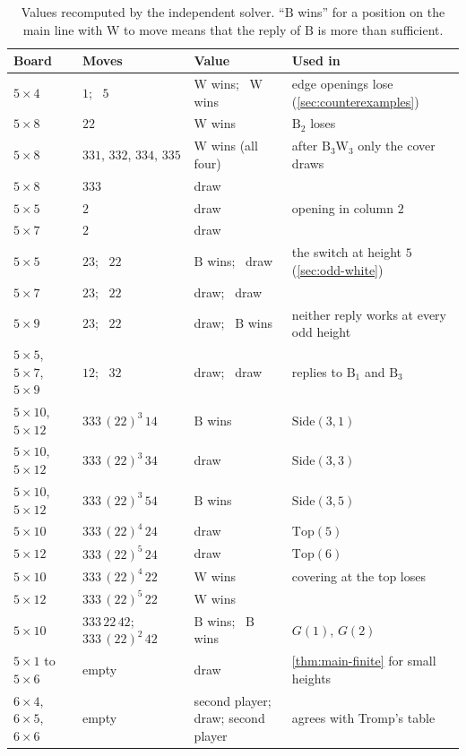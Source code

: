 \documentclass[11pt,a4paper]{article}
\theoremstyle{plain}
\theoremstyle{definition}
\newcommand{\B}{\mathrm{B}}
\newcommand{\W}{\mathrm{W}}
\newcommand{\Top}{\mathrm{Top}}
\newcommand{\Side}{\mathrm{Side}}
\begin{document}
\begin{table}[!htbp]
\centering
\caption{Values recomputed by the independent solver. ``$\B$ wins'' for a position on the main line with $\W$ to move means that the reply of $\B$ is more than sufficient.}
\label{tab:recheck}
\footnotesize
\begin{tabularx}{\linewidth}{@{}l l l Y@{}}
\toprule
\textbf{Board} & \textbf{Moves} & \textbf{Value} & \textbf{Used in} \\
\midrule
$5\times4$ & $1$; \ $5$ & $\W$ wins; \ $\W$ wins & edge openings lose (\cref{sec:counterexamples}) \\
$5\times8$ & $22$ & $\W$ wins & $\B_2$ loses \\
$5\times8$ & $331$, $332$, $334$, $335$ & $\W$ wins (all four) & after $\B_3\W_3$ only the cover draws \\
$5\times8$ & $333$ & draw & \\
\midrule
$5\times5$ & $2$ & draw & opening in column $2$ \\
$5\times7$ & $2$ & draw & \\
$5\times5$ & $23$; \ $22$ & $\B$ wins; \ draw & the switch at height $5$ (\cref{sec:odd-white}) \\
$5\times7$ & $23$; \ $22$ & draw; \ draw & \\
$5\times9$ & $23$; \ $22$ & draw; \ $\B$ wins & neither reply works at every odd height \\
$5\times5$, $5\times7$, $5\times9$ & $12$; \ $32$ & draw; \ draw & replies to $\B_1$ and $\B_3$ \\
\midrule
$5\times10$, $5\times12$ & $333\,(22)^3\,14$ & $\B$ wins & $\Side(3,1)$ \\
$5\times10$, $5\times12$ & $333\,(22)^3\,34$ & draw & $\Side(3,3)$ \\
$5\times10$, $5\times12$ & $333\,(22)^3\,54$ & $\B$ wins & $\Side(3,5)$ \\
$5\times10$ & $333\,(22)^4\,24$ & draw & $\Top(5)$ \\
$5\times12$ & $333\,(22)^5\,24$ & draw & $\Top(6)$ \\
$5\times10$ & $333\,(22)^4\,22$ & $\W$ wins & covering at the top loses \\
$5\times12$ & $333\,(22)^5\,22$ & $\W$ wins & \\
$5\times10$ & $333\,22\,42$; \ $333\,(22)^2\,42$ & $\B$ wins; \ $\B$ wins & $G(1)$, $G(2)$ \\
\midrule
$5\times1$ to $5\times6$ & empty & draw & \cref{thm:main-finite} for small heights \\
$6\times4$, $6\times5$, $6\times6$ & empty & second player; draw; second player & agrees with Tromp's table \cite{tromp2026} \\
\bottomrule
\end{tabularx}
\end{table}
\end{document}
